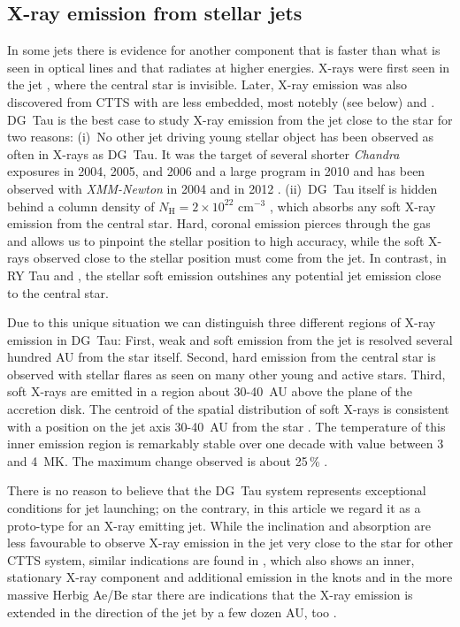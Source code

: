 \subsection{X-ray emission from stellar jets}
\label{sect:introxray}
In some jets there is evidence for another component that is faster than what is seen in optical lines and that radiates at higher energies. X-rays were first seen in the jet  \citep{2001Natur.413..708P,2012A&A...542A.123S}, where the central star is invisible. Later, X-ray emission was also discovered from CTTS with are less embedded, most notebly  (see below) and \citep{2014ApJ...788..101S}. DG~Tau is the best case to study X-ray emission from the jet close to the star for two reasons: (i)~No other jet driving young stellar object has been observed as often in X-rays as DG~Tau. It was the target of several shorter \emph{Chandra} exposures in 2004, 2005, and 2006 and a large program in 2010 \citep{2005ApJ...626L..53G,2008A&A...478..797G,2011ASPC..448..617G} and has been observed with \emph{XMM-Newton} in 2004 \citep{2007A&A...468..353G} and in 2012 \citep{SchneiderDGTauXray}. (ii)~DG~Tau itself is hidden behind a column density of $N_{\textrm{H}}=2\times10^{22}\textrm{ cm}^{-3}$ \citep{2008A&A...478..797G}, which absorbs any soft X-ray emission from the central star. Hard, coronal emission pierces through the gas and allows us to pinpoint the stellar position to high accuracy, while the soft X-rays observed close to the stellar position must come from the jet. In contrast, in RY Tau and  \citep{2013A&A...552A.142G}, the stellar soft emission outshines any potential jet emission close to the central star.

Due to this unique situation we can distinguish three different regions of X-ray emission in DG~Tau: First, weak and soft emission from the jet is resolved several hundred AU from the star itself. Second, hard emission from the central star is observed with stellar flares as seen on many other young and active stars. Third, soft X-rays are emitted in a region about 30-40~AU above the plane of the accretion disk. The centroid of the spatial distribution of soft X-rays is consistent with a position on the jet axis 30-40~AU from the star \citep{2008A&A...488L..13S}. The temperature of this inner emission region is remarkably stable over one decade with value between 3 and 4~MK. The maximum change observed is about 25\,\% \citep{SchneiderDGTauXray}.

There is no reason to believe that the DG~Tau system represents exceptional conditions for jet launching; on the contrary, in this article we regard it as a proto-type for an X-ray emitting jet. While the inclination and absorption are less favourable to observe X-ray emission in the jet very close to the star for other CTTS system, similar indications are found in  , which also shows an inner, stationary X-ray component and additional emission in the knots \citep{2010A&A...511A..42B,2011A&A...530A.123S} and in the more massive Herbig Ae/Be star  there are indications that the X-ray emission is extended in the direction of the jet by a few dozen AU, too \citep{2005ApJ...628..811S,2013A&A...552A.142G}.


